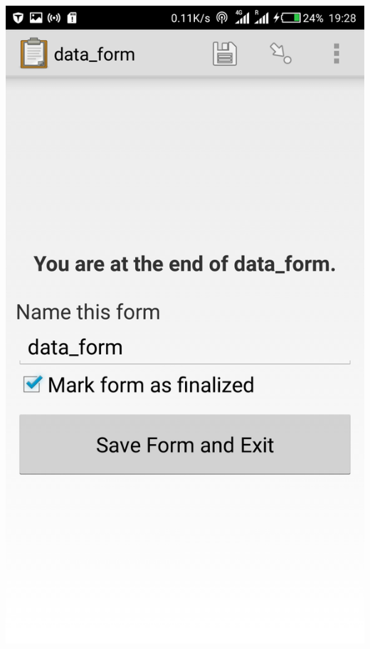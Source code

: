 \documentclass[12pt,letterpaper]{article}
\begin{document}
{						\includegraphics[scale=0.1]{paul4}
}
\end{document}
